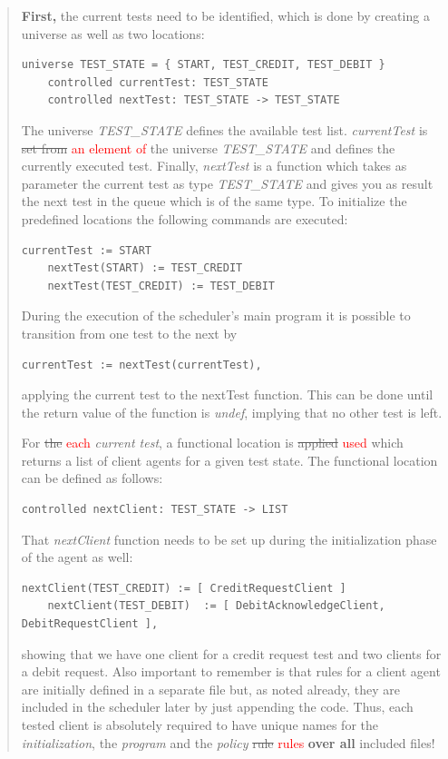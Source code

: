 \begin{quote}
\small
\textbf{First,} the current tests need to be identified, which is done by creating a universe as well as two locations:

\begin{lstlisting}[language=bsl]
	universe TEST_STATE = { START, TEST_CREDIT, TEST_DEBIT }
	controlled currentTest: TEST_STATE
	controlled nextTest: TEST_STATE -> TEST_STATE
\end{lstlisting}

The universe \textit{TEST\_STATE} defines the available test list. \textit{currentTest} is \st{set from} \textcolor{red}{an element of} the universe \textit{TEST\_STATE} and defines the currently executed test. Finally, \textit{nextTest} is a function which takes as parameter the current test as type \textit{TEST\_STATE} and gives you as result the next test in the queue which is of the same type. To initialize the predefined locations the following commands are executed:
\begin{lstlisting}[language=bsl]
	currentTest := START
	nextTest(START) := TEST_CREDIT
	nextTest(TEST_CREDIT) := TEST_DEBIT
\end{lstlisting}
During the execution of the scheduler's main program it is possible to transition from one test to the next by
\begin{lstlisting}[language=bsl]
	currentTest := nextTest(currentTest),
\end{lstlisting}
applying the current test to the nextTest function. This can be done until the return value of the function is \textit{undef}, implying that no other test is left.

For \st{the} \textcolor{red}{each} \textit{current test}, a functional location is \st{applied} \textcolor{red}{used} which returns a list of client agents for a given test state. The functional location can be defined as follows:
\begin{lstlisting}[language=bsl]
	controlled nextClient: TEST_STATE -> LIST
\end{lstlisting}

That \textit{nextClient} function needs to be set up during the initialization phase of the agent as well:
\begin{lstlisting}[language=bsl]
	nextClient(TEST_CREDIT) := [ CreditRequestClient ]
	nextClient(TEST_DEBIT)  := [ DebitAcknowledgeClient, DebitRequestClient ],
\end{lstlisting}
showing that we have one client for a credit request test and two clients for a debit request. Also important to remember is that rules for a client agent are initially defined in a separate file but, as noted already, they are included in the scheduler later by just appending the code. Thus, each tested client is absolutely required to have unique names for the \textit{initialization}, the \textit{program} and the \textit{policy} \st{rule} \textcolor{red}{rules} \textbf{over all} included files!


\end{quote}
